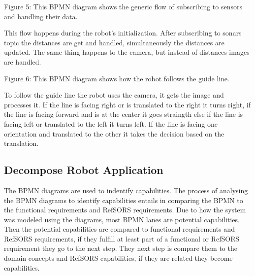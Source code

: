 Figure 5: This BPMN diagram shows the generic flow of subscribing to sensors and handling their data.

This flow happens during the robot's initialization. After subscribing to sonars topic the distances are get and handled, simultaneously the distances are updated. The same thing happens to the camera, but instead of distances images are handled.


Figure 6: This BPMN diagram shows how the robot follows the guide line.

To follow the guide line the robot uses the camera, it gets the image and processes it. If the line is facing right or is translated to the right it turns right, if the line is facing forward and is at the center it goes straingth else if the line is facing left or translated to the left it turns left. If the line is facing one orientation and translated to the other it takes the decision based on the translation.

\subsection{Decompose Robot Application}

The BPMN diagrams are used to indentify capabilities. The process of analysing the BPMN diagrams to identify capabilities entails in comparing the BPMN to the functional requirements and RefSORS requirements. Due to how the system was modeled using the diagrams, most BPMN lanes are potential capabilities. Then the potential capabilities are compared to functional requirements and RefSORS requirements, if they fulfill at least part of a functional or RefSORS requirement they go to the next step. They next step is compare them to the domain concepts and RefSORS capabilities, if they are related they become capabilities.

